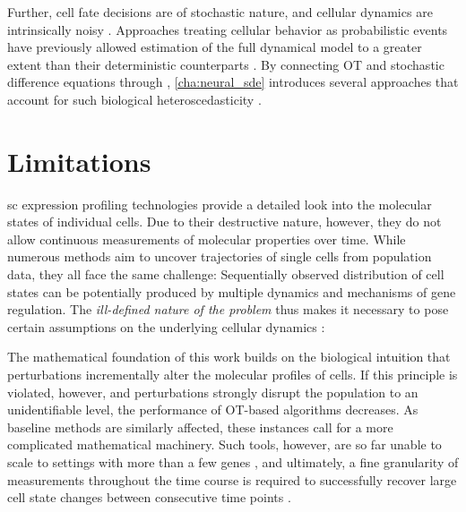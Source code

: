 Further, cell fate decisions are of stochastic nature, and cellular dynamics are intrinsically noisy \citep{wilkinson2009stochastic}.
Approaches treating cellular behavior as probabilistic events have previously allowed estimation of the full dynamical model to a greater extent than their deterministic counterparts \citep{bergen2020generalizing}.
By connecting \acrshort{OT} and stochastic difference equations through , \cref{cha:neural_sde} introduces several approaches that account for such biological heteroscedasticity \citep{bunne2022recovering, somnath2023aligned}.

\section*{Limitations}

\Acrlong{sc} expression profiling technologies provide a detailed look into the molecular states of individual cells. Due to their destructive nature, however, they do not allow continuous measurements of molecular properties over time. While numerous methods aim to uncover trajectories of single cells from population data, they all face the same challenge: Sequentially observed distribution of cell states can be potentially produced by multiple dynamics and mechanisms of gene regulation. The \emph{ill-defined nature of the problem} thus makes it necessary to pose certain assumptions on the underlying cellular dynamics \citep{weinreb2018fundamental}:

The mathematical foundation of this work builds on the biological intuition that perturbations incrementally alter the molecular profiles of cells. 
If this principle is violated, however, and perturbations strongly disrupt the population to an unidentifiable level, the performance of \acrlong{OT}-based algorithms decreases. As baseline methods are similarly affected, these instances call for a more complicated mathematical machinery.
Such tools, however, are so far unable to scale to settings with more than a few genes \citep{heydari2022iqcell}, and ultimately, a fine granularity of measurements throughout the time course is required to successfully recover large cell state changes between consecutive time points \citep{tritschler2019concepts}. \\

